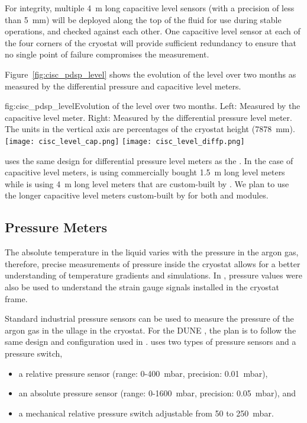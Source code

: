 For  integrity, multiple \SI{4}{m} long capacitive level sensors (with a precision of less than \SI{5}{mm}) will be deployed along the top of the fluid %
for use during stable operations, and checked against each other.
One capacitive level sensor at each of the four corners of the cryostat will provide sufficient redundancy to ensure that no single point of failure compromises the %
measurement.


Figure~\ref{fig:cisc_pdsp_level} shows the evolution of the   level over two months as measured by the differential pressure and capacitive level meters. 

\begin{dunefigure}{fig:cisc_pdsp_level}{Evolution of the   level over two months. Left: Measured by the capacitive level meter. Right: Measured by the differential pressure level meter. The units in the vertical axis are percentages of the cryostat height (\SI{7878}{mm}).}
  \texttt{[image: cisc\_level\_cap.png]}%
  \hspace*{1cm}
  \texttt{[image: cisc\_level\_diffp.png]}%
\end{dunefigure}

  uses the same design for differential pressure level meters %
as the . In the case of capacitive level meters,  is using commercially bought \SI{1.5}{m} long level meters while  is using  \SI{4}{m} long level meters that are custom-built by . %
We plan to use the longer capacitive level meters custom-built by   for both  and  modules.

\subsection{Pressure Meters}
\label{sec:fdgen-slow-cryo-press-meter}

The absolute temperature in the liquid varies with the pressure in the argon gas, therefore, precise measurements of pressure inside the cryostat allows for a better understanding of temperature gradients and  simulations. In , pressure values were also be used to understand the strain gauge signals installed in the cryostat frame.

Standard industrial pressure sensors can be used to measure the pressure of the argon gas in the ullage in the cryostat. For the DUNE , the plan is to follow the same design and configuration used in .  uses two types of pressure sensors and a pressure switch, %
\begin{itemize}
    \item a relative pressure sensor (range: 0-400~mbar, precision: 0.01~mbar),
    \item an absolute pressure sensor (range: 0-1600~mbar, precision: 0.05~mbar), and
    \item a mechanical relative pressure switch adjustable from 50 to 250~mbar. 
\end{itemize}

